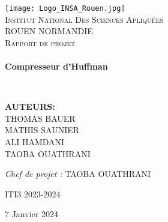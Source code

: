 \begin{titlepage}
  \begin{center}

    \texttt{[image: Logo\_INSA\_Rouen.jpg]}~\\[1.5cm]

    \textsc{\LARGE Institut National Des Sciences Apliquées}\\[0.5cm]
    \textsc{\LARGE ROUEN NORMANDIE}\\[2cm]

    \textsc{\Large Rapport de projet}\\[2cm]

    \HRule \\[0.4cm]
    {\huge\bfseries Compresseur d'Huffman\\[0.4cm] }

    \HRule \\[2cm]
    
   

    \begin{minipage}{0.4\textwidth}
      \begin{flushleft} \large
        \textbf{AUTEURS:}\\
        \textsc{THOMAS BAUER\\
        MATHIS SAUNIER\\
        ALI HAMDANI\\
        TAOBA OUATHRANI}\\
      \end{flushleft}
    \end{minipage}
    \begin{minipage}{0.4\textwidth}
      \begin{flushright} \large
        \emph{Chef de projet : } TAOBA OUATHRANI 
      \end{flushright}
    \end{minipage}
    
    \begin{center}
      ITI3 2023-2024
    \end{center}
      
    \vfill
  
    \large 7 Janvier 2024

  \end{center}
\end{titlepage}



    